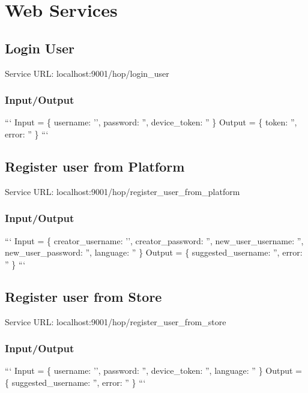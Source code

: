 \section*{Web Services}

\subsection*{Login User}

Service U\-R\-L\-: {\ttfamily localhost\-:9001/hop/login\-\_\-user}

\subsubsection*{Input/\-Output}

``` Input = \{ username\-: '', password\-: '', device\-\_\-token\-: '' \} {\ttfamily  } Output = \{ token\-: '', error\-: '' \} ```

\subsection*{Register user from Platform}

Service U\-R\-L\-: {\ttfamily localhost\-:9001/hop/register\-\_\-user\-\_\-from\-\_\-platform}

\subsubsection*{Input/\-Output}

``` Input = \{ creator\-\_\-username\-: '', creator\-\_\-password\-: '', new\-\_\-user\-\_\-username\-: '', new\-\_\-user\-\_\-password\-: '', language\-: '' \} {\ttfamily  } Output = \{ suggested\-\_\-username\-: '', error\-: '' \} ```

\subsection*{Register user from Store}

Service U\-R\-L\-: {\ttfamily localhost\-:9001/hop/register\-\_\-user\-\_\-from\-\_\-store}

\subsubsection*{Input/\-Output}

``` Input = \{ username\-: '', password\-: '', device\-\_\-token\-: '', language\-: '' \} {\ttfamily  } Output = \{ suggested\-\_\-username\-: '', error\-: '' \} ``` 